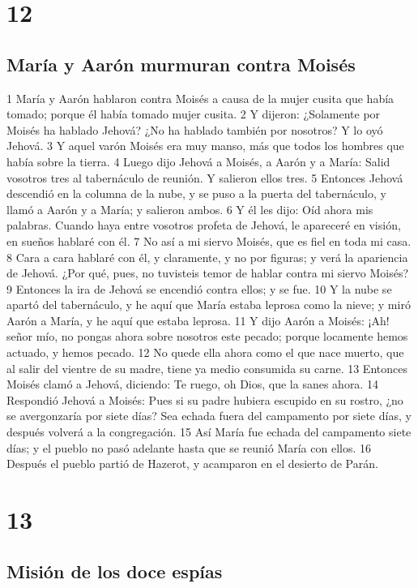 \chapter{12}

\section*{María y Aarón murmuran contra Moisés}

1 María y Aarón hablaron contra Moisés a causa de la mujer cusita que había tomado; porque él había tomado mujer cusita.
2 Y dijeron: ¿Solamente por Moisés ha hablado Jehová? ¿No ha hablado también por nosotros? Y lo oyó Jehová.
3 Y aquel varón Moisés era muy manso, más que todos los hombres que había sobre la tierra.
4 Luego dijo Jehová a Moisés, a Aarón y a María: Salid vosotros tres al tabernáculo de reunión. Y salieron ellos tres.
5 Entonces Jehová descendió en la columna de la nube, y se puso a la puerta del tabernáculo, y llamó a Aarón y a María; y salieron ambos. 
6 Y él les dijo: Oíd ahora mis palabras. Cuando haya entre vosotros profeta de Jehová, le apareceré en visión, en sueños hablaré con él.
7 No así a mi siervo Moisés, que es fiel en toda mi casa.
8 Cara a cara hablaré con él, y claramente, y no por figuras; y verá la apariencia de Jehová. ¿Por qué, pues, no tuvisteis temor de hablar contra mi siervo Moisés?
9 Entonces la ira de Jehová se encendió contra ellos; y se fue.
10 Y la nube se apartó del tabernáculo, y he aquí que María estaba leprosa como la nieve; y miró Aarón a María, y he aquí que estaba leprosa.
11 Y dijo Aarón a Moisés: ¡Ah! señor mío, no pongas ahora sobre nosotros este pecado; porque locamente hemos actuado, y hemos pecado.
12 No quede ella ahora como el que nace muerto, que al salir del vientre de su madre, tiene ya medio consumida su carne.
13 Entonces Moisés clamó a Jehová, diciendo: Te ruego, oh Dios, que la sanes ahora.
14 Respondió Jehová a Moisés: Pues si su padre hubiera escupido en su rostro, ¿no se avergonzaría por siete días? Sea echada fuera del campamento por siete días, y después volverá a la congregación.
15 Así María fue echada del campamento siete días; y el pueblo no pasó adelante hasta que se reunió María con ellos.
16 Después el pueblo partió de Hazerot, y acamparon en el desierto de Parán.

\chapter{13}

\section*{Misión de los doce espías }

